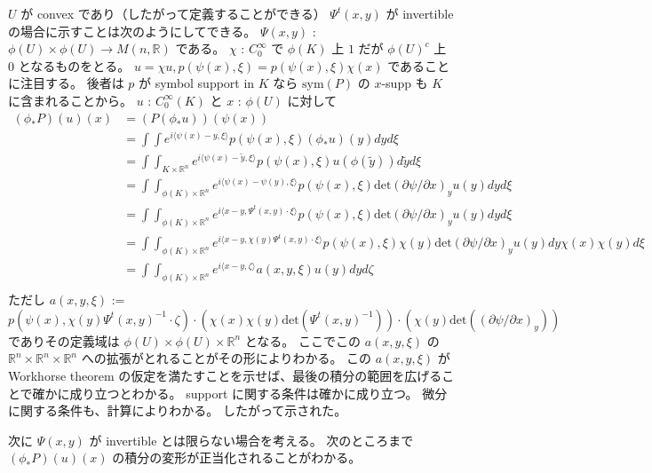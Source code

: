 \(U\) が convex であり（したがって定義することができる） \(\Psi^t(x,y)\) が invertible の場合に示すことは次のようにしてできる。
\(\Psi(x,y)\) : \(\phi(U) \times \phi(U) \to M(n , \mathbb{R})\) である。
\(\chi\) : \(C^\infty_0\) で \(\phi(K)\) 上 \(1\) だが \(\phi(U)^c\) 上 \(0\) となるものをとる。
\(u = \chi u , p(\psi(x),\xi) = p(\psi(x),\xi) \chi(x)\) であることに注目する。
後者は \(p\) が symbol support in \(K\) なら \(\text{sym}(P)\) の \(x\)-supp も \(K\) に含まれることから。
\(u\) : \(C^\infty_0(K)\) と \(x\) : \(\phi(U)\) に対して
\begin{align*}
  (\phi_* P)(u)(x) &= (P(\phi_* u)) (\psi(x)) \\
  &= \int \int e^{i \langle \psi(x) - y , \xi \rangle} p(\psi(x) , \xi) (\phi_* u)(y) dy d\xi \\
  &= \int \int_{K \times \mathbb{R}^n} e^{i \langle \psi(x) - \tilde{y} , \xi \rangle} p(\psi(x) , \xi) u(\phi(\tilde{y})) d\tilde{y} d\xi \\
  &= \int \int_{\phi(K) \times \mathbb{R}^n} e^{i \langle \psi(x) - \psi(y) , \xi \rangle} p(\psi(x) , \xi) \text{det} (\partial \psi / \partial x)_y u(y) dy d\xi \\
  &= \int \int_{\phi(K) \times \mathbb{R}^n} e^{i \langle x - y , \Psi^t(x,y) \cdot \xi \rangle} p(\psi(x) , \xi) \text{det} (\partial \psi / \partial x)_y u(y) dy d\xi \\
  &= \int \int_{\phi(K) \times \mathbb{R}^n} e^{i \langle x - y , \chi(y) \Psi^t(x,y) \cdot \xi \rangle} p(\psi(x) , \xi) \chi(y) \text{det} (\partial \psi / \partial x)_y u(y) dy \chi(x) \chi(y) d\xi \\
  &= \int \int_{\phi(K) \times \mathbb{R}^n} e^{i \langle x - y , \zeta \rangle} a(x,y,\xi) u(y) dy d\zeta \\
\end{align*}
ただし \(a(x,y,\xi)\) := \(p(\psi(x) , \chi(y) \Psi^t(x,y)^{-1} \cdot \zeta) \cdot (\chi(x) \chi(y) \text{det} (\Psi^t(x,y)^{-1})) \cdot (\chi(y) \text{det} ((\partial \psi / \partial x)_y))\) でありその定義域は \(\phi(U) \times \phi(U) \times \mathbb{R}^n\) となる。
ここでこの \(a(x,y,\xi)\) の \(\mathbb{R}^n \times \mathbb{R}^n \times \mathbb{R}^n\) への拡張がとれることがその形によりわかる。
この \(a(x,y,\xi)\) が Workhorse theorem の仮定を満たすことを示せば、最後の積分の範囲を広げることで確かに成り立つとわかる。
support に関する条件は確かに成り立つ。
微分に関する条件も、計算によりわかる。
したがって示された。

次に \(\Psi(x,y)\) が invertible とは限らない場合を考える。
次のところまで \((\phi_* P)(u)(x)\) の積分の変形が正当化されることがわかる。

